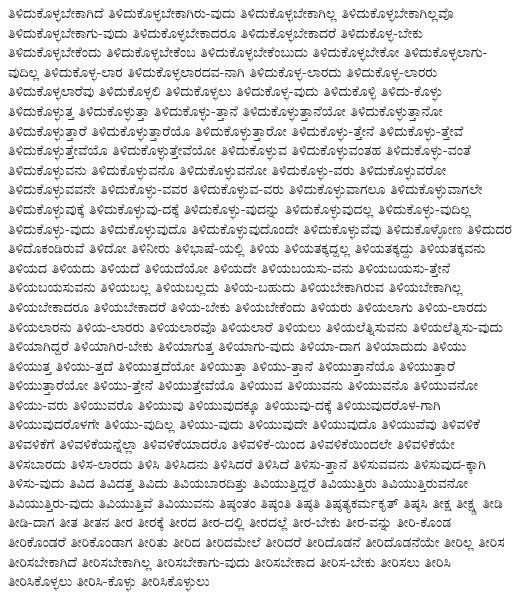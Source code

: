 {ತಿಳಿದುಕೊಳ್ಳಬೇಕಾಗಿದೆ
ತಿಳಿದುಕೊಳ್ಳಬೇಕಾಗಿರು-ವುದು
ತಿಳಿದುಕೊಳ್ಳಬೇಕಾಗಿಲ್ಲ
ತಿಳಿದುಕೊಳ್ಳಬೇಕಾಗಿಲ್ಲವೊ
ತಿಳಿದುಕೊಳ್ಳಬೇಕಾಗು-ವುದು
ತಿಳಿದುಕೊಳ್ಳಬೇಕಾದರೂ
ತಿಳಿದುಕೊಳ್ಳಬೇಕಾದರೆ
ತಿಳಿದುಕೊಳ್ಳ-ಬೇಕು
ತಿಳಿದುಕೊಳ್ಳಬೇಕೆಂದು
ತಿಳಿದುಕೊಳ್ಳಬೇಕೆಂಬ
ತಿಳಿದುಕೊಳ್ಳಬೇಕೆಂಬುದು
ತಿಳಿದುಕೊಳ್ಳಬೇಕೋ
ತಿಳಿದುಕೊಳ್ಳಲಾಗು-ವುದಿಲ್ಲ
ತಿಳಿದುಕೊಳ್ಳ-ಲಾರ
ತಿಳಿದುಕೊಳ್ಳಲಾರದವ-ನಾಗಿ
ತಿಳಿದುಕೊಳ್ಳ-ಲಾರದು
ತಿಳಿದುಕೊಳ್ಳ-ಲಾರರು
ತಿಳಿದುಕೊಳ್ಳಲಾರೆವು
ತಿಳಿದುಕೊಳ್ಳಲಿ
ತಿಳಿದುಕೊಳ್ಳಲು
ತಿಳಿದುಕೊಳ್ಳ-ವುದು
ತಿಳಿದುಕೊಳ್ಳಿ
ತಿಳಿದು-ಕೊಳ್ಳು
ತಿಳಿದುಕೊಳ್ಳುತ್ತ
ತಿಳಿದುಕೊಳ್ಳುತ್ತಾ
ತಿಳಿದುಕೊಳ್ಳು-ತ್ತಾನೆ
ತಿಳಿದುಕೊಳ್ಳುತ್ತಾನೆಯೋ
ತಿಳಿದುಕೊಳ್ಳುತ್ತಾನೋ
ತಿಳಿದುಕೊಳ್ಳುತ್ತಾರೆ
ತಿಳಿದುಕೊಳ್ಳುತ್ತಾರೆಯೊ
ತಿಳಿದುಕೊಳ್ಳುತ್ತಾರೋ
ತಿಳಿದುಕೊಳ್ಳು-ತ್ತೇನೆ
ತಿಳಿದುಕೊಳ್ಳು-ತ್ತೇವೆ
ತಿಳಿದುಕೊಳ್ಳುತ್ತೇವೆಯೊ
ತಿಳಿದುಕೊಳ್ಳುತ್ತೇವೆಯೋ
ತಿಳಿದುಕೊಳ್ಳುವ
ತಿಳಿದುಕೊಳ್ಳುವಂತಹ
ತಿಳಿದುಕೊಳ್ಳು-ವಂತೆ
ತಿಳಿದುಕೊಳ್ಳುವನು
ತಿಳಿದುಕೊಳ್ಳುವನೊ
ತಿಳಿದುಕೊಳ್ಳುವನೋ
ತಿಳಿದುಕೊಳ್ಳು-ವರು
ತಿಳಿದುಕೊಳ್ಳುವರೋ
ತಿಳಿದುಕೊಳ್ಳುವವನೇ
ತಿಳಿದುಕೊಳ್ಳು-ವವರ
ತಿಳಿದುಕೊಳ್ಳುವ-ವರು
ತಿಳಿದುಕೊಳ್ಳುವಾಗಲೂ
ತಿಳಿದುಕೊಳ್ಳುವಾಗಲೇ
ತಿಳಿದುಕೊಳ್ಳುವುಕ್ಕೆ
ತಿಳಿದುಕೊಳ್ಳುವು-ದಕ್ಕೆ
ತಿಳಿದುಕೊಳ್ಳು-ವುದನ್ನು
ತಿಳಿದುಕೊಳ್ಳುವುದಲ್ಲ
ತಿಳಿದುಕೊಳ್ಳು-ವುದಿಲ್ಲ
ತಿಳಿದುಕೊಳ್ಳು-ವುದು
ತಿಳಿದುಕೊಳ್ಳುವುದೊ
ತಿಳಿದುಕೊಳ್ಳುವುದೊಂದೇ
ತಿಳಿದುಕೊಳ್ಳುವೆವು
ತಿಳಿದುಕೊಳ್ಳೋಣ
ತಿಳಿದುದರ
ತಿಳಿದೊಕಂಡಿರುವೆ
ತಿಳಿದೋ
ತಿಳಿನೀರು
ತಿಳಿಭಾಷೆ-ಯಲ್ಲಿ
ತಿಳಿಯ
ತಿಳಿಯತಕ್ಕದ್ದಲ್ಲ
ತಿಳಿಯತಕ್ಕದ್ದು
ತಿಳಿಯತಕ್ಕವನು
ತಿಳಿಯದ
ತಿಳಿಯದು
ತಿಳಿಯದೆ
ತಿಳಿಯದೆಯೋ
ತಿಳಿಯದೇ
ತಿಳಿಯಬಯಸು-ವನು
ತಿಳಿಯಬಯಸು-ತ್ತೇನೆ
ತಿಳಿಯಬಯಸುವನು
ತಿಳಿಯಬಲ್ಲ
ತಿಳಿಯಬಲ್ಲದು
ತಿಳಿಯ-ಬಹುದು
ತಿಳಿಯಬೇಕಾಗಿರುವ
ತಿಳಿಯಬೇಕಾಗಿಲ್ಲ
ತಿಳಿಯಬೇಕಾದರೂ
ತಿಳಿಯಬೇಕಾದರೆ
ತಿಳಿಯ-ಬೇಕು
ತಿಳಿಯಬೇಕೆಂದು
ತಿಳಿಯರು
ತಿಳಿಯಲಾಗು
ತಿಳಿಯ-ಲಾರದು
ತಿಳಿಯಲಾರನು
ತಿಳಿಯ-ಲಾರರು
ತಿಳಿಯಲಾರವೊ
ತಿಳಿಯಲಾರೆ
ತಿಳಿಯಲು
ತಿಳಿಯಲೆತ್ನಿಸುವನು
ತಿಳಿಯಲೆತ್ನಿಸು-ವುದು
ತಿಳಿಯಾಗಿದ್ದರೆ
ತಿಳಿಯಾಗಿರ-ಬೇಕು
ತಿಳಿಯಾಗುತ್ತ
ತಿಳಿಯಾಗು-ವುದು
ತಿಳಿಯಾ-ದಾಗ
ತಿಳಿಯಾದುದು
ತಿಳಿಯು
ತಿಳಿಯುತ್ತ
ತಿಳಿಯು-ತ್ತದೆ
ತಿಳಿಯುತ್ತದೆಯೋ
ತಿಳಿಯುತ್ತಾ
ತಿಳಿಯು-ತ್ತಾನೆ
ತಿಳಿಯುತ್ತಾನೆಯೊ
ತಿಳಿಯುತ್ತಾರೆ
ತಿಳಿಯುತ್ತಾರೆಯೋ
ತಿಳಿಯು-ತ್ತೇನೆ
ತಿಳಿಯುತ್ತೇವೆಯೊ
ತಿಳಿಯುವ
ತಿಳಿಯುವನು
ತಿಳಿಯುವನೊ
ತಿಳಿಯುವನೋ
ತಿಳಿಯು-ವರು
ತಿಳಿಯುವರೊ
ತಿಳಿಯುವು
ತಿಳಿಯುವುದಕ್ಕೂ
ತಿಳಿಯುವು-ದಕ್ಕೆ
ತಿಳಿಯುವುದರೊಳ-ಗಾಗಿ
ತಿಳಿಯುವುದರೊಳಗೇ
ತಿಳಿಯು-ವುದಿಲ್ಲ
ತಿಳಿಯು-ವುದು
ತಿಳಿಯುವುದೇ
ತಿಳಿಯುವುದೊ
ತಿಳಿಯುವೆವು
ತಿಳಿವಳಿಕೆ
ತಿಳಿವಳಿಕೆಗೆ
ತಿಳಿವಳಿಕೆಯನ್ನೆಲ್ಲಾ
ತಿಳಿವಳಿಕೆಯಾದರೊ
ತಿಳಿವಳಿಕೆ-ಯಿಂದ
ತಿಳಿವಳಿಕೆಯಿಂದಲೇ
ತಿಳಿವಳಿಕೆಯೇ
ತಿಳಿಸಬಾರದು
ತಿಳಿಸ-ಲಾರದು
ತಿಳಿಸಿ
ತಿಳಿಸಿದನು
ತಿಳಿಸಿದರೆ
ತಿಳಿಸಿದೆ
ತಿಳಿಸು-ತ್ತಾನೆ
ತಿಳಿಸುವವನು
ತಿಳಿಸುವುದ-ಕ್ಕಾಗಿ
ತಿಳಿಸು-ವುದು
ತಿವಿದ
ತಿವಿದತ್ತ
ತಿವಿದು
ತಿವಿಯಬಾರದಿತ್ತು
ತಿವಿಯುತ್ತಿದ್ದರೆ
ತಿವಿಯುತ್ತಿರು
ತಿವಿಯುತ್ತಿರುವನೋ
ತಿವಿಯುತ್ತಿರು-ವುದು
ತಿವಿಯುತ್ತಿವೆ
ತಿವಿಯುವನು
ತಿಷ್ಠಂತಂ
ತಿಷ್ಠಂತಿ
ತಿಷ್ಠತಿ
ತಿಷ್ಠತ್ಯಕರ್ಮಕೃತ್
ತಿಷ್ಠಸಿ
ತೀಕ್ಷ
ತೀಕ್ಷ್ಣ
ತೀಡಿ
ತೀಡಿ-ದಾಗ
ತೀತ
ತೀತನ
ತೀರ
ತೀರಕ್ಕೆ
ತೀರದ
ತೀರ-ದಲ್ಲಿ
ತೀರದಲ್ಲೆ
ತೀರ-ಬೇಕು
ತೀರ-ವನ್ನು
ತೀರಿ-ಕೊಂಡ
ತೀರಿಕೊಂಡರೆ
ತೀರಿಕೊಂಡಾಗ
ತೀರಿತು
ತೀರಿದ
ತೀರಿದಮೇಲೆ
ತೀರಿದರೆ
ತೀರಿದೊಡನೆ
ತೀರಿದೊಡನೆಯೇ
ತೀರಿಲ್ಲ
ತೀರಿಸ
ತೀರಿಸಬೇಕಾಗಿದೆ
ತೀರಿಸಬೇಕಾಗಿಲ್ಲ
ತೀರಿಸಬೇಕಾಗು-ವುದು
ತೀರಿಸಬೇಕಾದ
ತೀರಿಸ-ಬೇಕು
ತೀರಿಸಲು
ತೀರಿಸಿ
ತೀರಿಸಿಕೊಳ್ಳಲು
ತೀರಿಸಿ-ಕೊಳ್ಳು
ತೀರಿಸಿಕೊಳ್ಳುಲು
}

